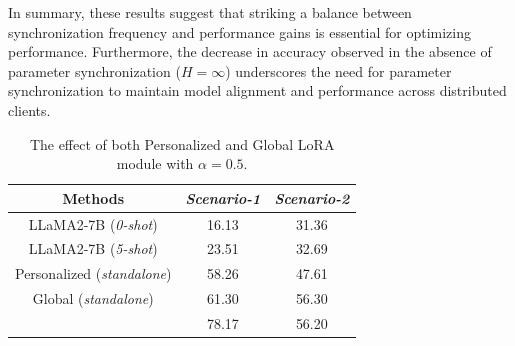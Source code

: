 \documentclass[sigconf]{acmart}
\newcommand\our{\text{FDLoRA}}
\begin{document}
\par
In summary, these results suggest that striking a balance between synchronization frequency and performance gains is essential for optimizing \our{} performance. Furthermore, the decrease in accuracy observed in the absence of parameter synchronization ($H=\infty$) underscores the need for parameter synchronization to maintain model alignment and performance across distributed clients.


\begin{table}[!tb]
\centering
\caption{The effect of both Personalized and Global LoRA module with $\alpha = 0.5$.}
\label{tab:lora_ablation}
\begin{tabular}{ccc} 
\toprule
Methods    & \textit{Scenario-1}   & \textit{Scenario-2}  \\ 
\midrule
LLaMA2-7B (\textit{0-shot})    & 16.13 & 31.36        \\
LLaMA2-7B (\textit{5-shot})    & 23.51 & 32.69        \\
Personalized (\textit{standalone})  & 58.26 & 47.61        \\
Global (\textit{standalone}) & 61.30 & 56.30        \\
\midrule
\our{(Ours)} & 78.17 & 56.20 \\
\bottomrule
\end{tabular}
\end{table}
\end{document}

